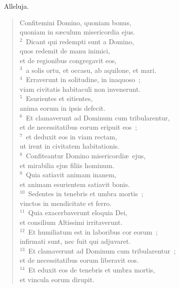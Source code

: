 ~\lettrine[lines=10,image=true,loversize=0.05,lraise=-0.03]{A}{}lleluja. \begin{flushleft}\begin{verse}\vspace{6pt}Confitemini Domino, quoniam bonus,\\ quoniam in s\ae culum misericordia ejus.\\
${}^{2}$~Dicant qui redempti sunt a Domino,\\ quos redemit de manu inimici,\\ et de regionibus congregavit eos,\\
${}^{3}$~a solis ortu, et occasu, ab aquilone, et mari.\\
${}^{4}$~Erraverunt in solitudine, in inaquoso~;\\ viam civitatis habitaculi non invenerunt.\\
${}^{5}$~Esurientes et sitientes,\\ anima eorum in ipsis defecit.\\
${}^{6}$~Et clamaverunt ad Dominum cum tribularentur,\\ et de necessitatibus eorum eripuit eos~;\\
${}^{7}$~et deduxit eos in viam rectam,\\ ut irent in civitatem habitationis.\\
${}^{8}$~Confiteantur Domino misericordi\ae\ ejus,\\ et mirabilia ejus filiis hominum.\\
${}^{9}$~Quia satiavit animam inanem,\\ et animam esurientem satiavit bonis.\\
${}^{10}$~Sedentes in tenebris et umbra mortis~;\\ vinctos in mendicitate et ferro.\\
${}^{11}$~Quia exacerbaverunt eloquia Dei,\\ et consilium Altissimi irritaverunt.\\
${}^{12}$~Et humiliatum est in laboribus cor eorum~;\\ infirmati sunt, nec fuit qui adjuvaret.\\
${}^{13}$~Et clamaverunt ad Dominum cum tribularentur~;\\ et de necessitatibus eorum liberavit eos.\\
${}^{14}$~Et eduxit eos de tenebris et umbra mortis,\\ et vincula eorum dirupit.\\

\end{verse}
\end{flushleft}

